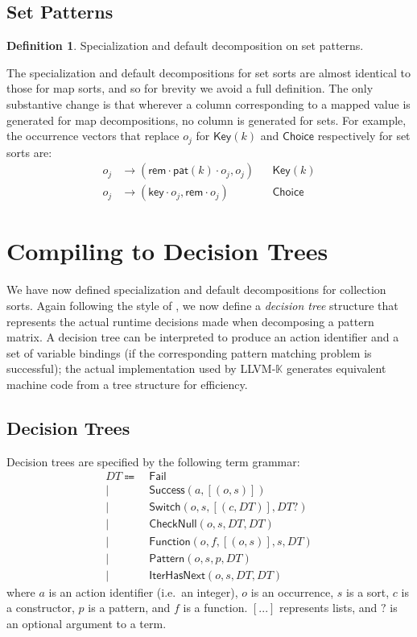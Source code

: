 \documentclass{article}
\theoremstyle{definition}
\newtheorem{definition}{Definition}[section]
\newcommand{\K}{$\mathbb{K}$\xspace}
\newcommand{\KL}{LLVM-\K}
\newcommand{\mapkey}{\mathsf{Key}}
\newcommand{\mapchoice}{\mathsf{Choice}}
\newcommand{\DT}{\mathit{DT}}
\newcommand{\rem}{\mathsf{rem}}
\newcommand{\key}{\mathsf{key}}
\newcommand{\pat}{\mathsf{pat}}
\newcommand{\Success}{\mathsf{Success}}
\newcommand{\CheckNull}{\mathsf{CheckNull}}
\newcommand{\IterHasNext}{\mathsf{IterHasNext}}
\newcommand{\Fail}{\mathsf{Fail}}
\newcommand{\Switch}{\mathsf{Switch}}
\newcommand{\FunctionDT}{\mathsf{Function}}
\newcommand{\Pattern}{\mathsf{Pattern}}
\begin{document}
\subsection{Set Patterns} \label{sec:decomp:set}

\begin{definition}{Specialization and default decomposition on set patterns.}

The specialization and default decompositions for set sorts are almost identical
to those for map sorts, and so for brevity we avoid a full definition. The only
substantive change is that wherever a column corresponding to a mapped value
is generated for map decompositions, no column is generated for sets. For
example, the occurrence vectors that replace $ o_j $ for $ \mapkey(k) $ and $
\mapchoice $ respectively for set sorts are:
\begin{align*}
  o_j & \to (\rem \cdot \pat(k) \cdot o_j, o_j)
      && \mapkey(k) \\
  o_j & \to (\key \cdot o_j, \rem \cdot o_j)
      && \mapchoice
\end{align*}

\end{definition}

\section{Compiling to Decision Trees} \label{sec:compile}

We have now defined specialization and default decompositions for collection
sorts. Again following the style of \citet{Maranget2008}, we now define a
\emph{decision tree} structure that represents the actual runtime decisions made
when decomposing a pattern matrix. A decision tree can be interpreted
to produce an action identifier and a set of variable bindings (if the
corresponding pattern matching problem is successful); the actual implementation
used by \KL generates equivalent machine code from a tree structure for
efficiency.


\subsection{Decision Trees} \label{sec:dt-adt}

Decision trees are specified by the following term grammar:
\begin{align*}
  \DT \Coloneqq & \: \Fail \\
      \mid      & \: \Success(a, [(o, s)]) \\
      \mid      & \: \Switch(o, s, [(c, \DT)], DT?) \\
      \mid      & \: \CheckNull(o, s, \DT, \DT) \\
      \mid      & \: \FunctionDT(o, f, [(o, s)], s, \DT) \\
      \mid      & \: \Pattern(o, s, p, \DT) \\
      \mid      & \: \IterHasNext(o, s, \DT, \DT)
\end{align*}
where $ a $ is an action identifier (i.e.\ an integer), $ o $ is an occurrence,
$ s $ is a sort, $ c $ is a constructor, $ p $ is a pattern, and $ f $ is a
function. $ [...] $ represents lists, and $ ? $ is an optional argument to a term.
\end{document}

